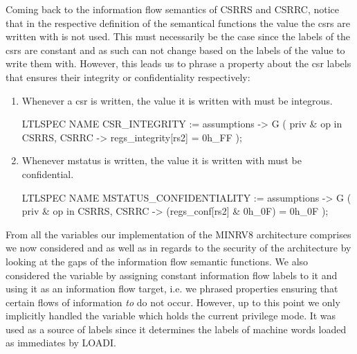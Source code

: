 Coming back to the information flow semantics of CSRRS and CSRRC, notice that in the respective definition of the semantical functions the value the \glspl{csr} are written with is not used.
This must necessarily be the case since the labels of the \glspl{csr} are constant and as such can not change based on the labels of the value to write them with.
However, this leads us to phrase a property about the \gls{csr} labels that ensures their integrity or confidentiality respectively:
\begin{enumerate}[label=\Roman*.,resume]
    \item \label{itm:prop-csr-i}
    Whenever a \gls{csr} is written, the value it is written with must be integrous.

    \begin{smv}[caption={Implementation of property \ref{itm:prop-csr-i}}]
LTLSPEC NAME CSR_INTEGRITY :=
    assumptions -> G (
        priv & op in { CSRRS, CSRRC }
        -> regs_integrity[rs2] = 0h_FF
    );
    \end{smv}

    \item \label{itm:prop-mstatus-c}
    Whenever \gls{mstatus} is written, the value it is written with must be confidential.
    \begin{smv}[caption={Implementation of property \ref{itm:prop-mstatus-c}}]
LTLSPEC NAME MSTATUS_CONFIDENTIALITY :=
    assumptions -> G (
        priv & op in { CSRRS, CSRRC }
        -> (regs_conf[rs2] & 0h_0F) = 0h_0F
    );
    \end{smv}
\end{enumerate}

From all the variables our implementation of the MINRV8 architecture comprises we now considered  and  as well as  in regards to the security of the architecture by looking at the gaps of the information flow semantic functions.
We also considered the variable  by assigning constant information flow labels to it and using it as an information flow target, i.e. we phrased properties ensuring that certain flows of information \textit{to}  do not occur.
However, up to this point we only implicitly handled the  variable which holds the current privilege mode.
It was used as a source of labels since it determines the labels of machine words loaded as immediates by LOADI.


